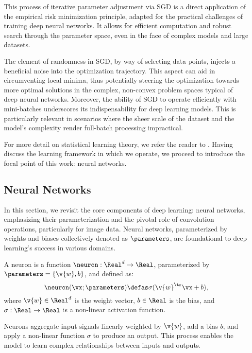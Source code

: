 This process of iterative parameter adjustment via SGD is a direct application of the empirical risk minimization principle, adapted for the practical challenges of training deep neural networks. It allows for efficient computation and robust search through the parameter space, even in the face of complex models and large datasets.

The element of randomness in SGD, by way of selecting data points, injects a beneficial noise into the optimization trajectory. This aspect can aid in circumventing local minima, thus potentially steering the optimization towards more optimal solutions in the complex, non-convex problem spaces typical of deep neural networks. Moreover, the ability of SGD to operate efficiently with mini-batches underscores its indispensability for deep learning models. This is particularly relevant in scenarios where the sheer scale of the dataset and the model's complexity render full-batch processing impractical.

For more detail on statistical learning theory, we refer the reader to \cite{hastie2009elements}. Having discuss the learning framework in which we operate, we proceed to introduce the focal point of this work: neural networks.

\subsection{Neural Networks}

In this section, we revisit the core components of deep learning: neural networks, emphasizing their parameterization and the pivotal role of convolution operations, particularly for image data. Neural networks, parameterized by weights and biases collectively denoted as $\parameters$, are foundational to deep learning's success in various domains.

\begin{definition}[Neuron]
A neuron is a function $\neuron: \Real^d \to \Real$, parameterized by $\parameters = \{\v{w}, b\}$, and defined as:
\[
\neuron(\vx; \parameters) \defas \sigma(\v{w}^\tr \vx + b),
\]
where $\v{w} \in \Real^d$ is the weight vector, $b \in \Real$ is the bias, and $\sigma: \Real \to \Real$ is a non-linear activation function.
\end{definition}

Neurons aggregate input signals linearly weighted by $\v{w}$, add a bias $b$, and apply a non-linear function $\sigma$ to produce an output. This process enables the model to learn complex relationships between inputs and outputs.


